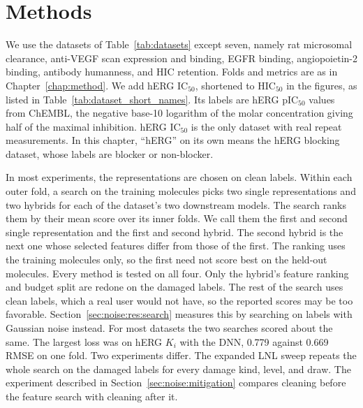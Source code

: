 \section{Methods}\label{sec:noise:methods}

We use the datasets of Table~\ref{tab:datasets} except seven, namely rat microsomal clearance, anti-VEGF scan expression and binding, EGFR binding, angiopoietin-2 binding, antibody humanness, and HIC retention. Folds and metrics are as in Chapter~\ref{chap:method}. We add hERG IC$_{50}$, shortened to HIC$_{50}$ in the figures, as listed in Table~\ref{tab:dataset_short_names}. Its labels are hERG pIC$_{50}$ values from ChEMBL, the negative base-10 logarithm of the molar concentration giving half of the maximal inhibition. hERG IC$_{50}$ is the only dataset with real repeat measurements. In this chapter, ``hERG'' on its own means the hERG blocking dataset, whose labels are blocker or non-blocker.

In most experiments, the representations are chosen on clean labels. Within each outer fold, a search on the training molecules picks two single representations and two hybrids for each of the dataset's two downstream models. The search ranks them by their mean score over its inner folds. We call them the first and second single representation and the first and second hybrid. The second hybrid is the next one whose selected features differ from those of the first. The ranking uses the training molecules only, so the first need not score best on the held-out molecules. Every method is tested on all four. Only the hybrid's feature ranking and budget split are redone on the damaged labels. The rest of the search uses clean labels, which a real user would not have, so the reported scores may be too favorable. Section~\ref{sec:noise:res:search} measures this by searching on labels with Gaussian noise instead. For most datasets the two searches scored about the same. The largest loss was on hERG $K_i$ with the DNN, 0.779 against 0.669 RMSE on one fold. Two experiments differ. The expanded LNL sweep repeats the whole search on the damaged labels for every damage kind, level, and draw. The experiment described in Section~\ref{sec:noise:mitigation} compares cleaning before the feature search with cleaning after it.

